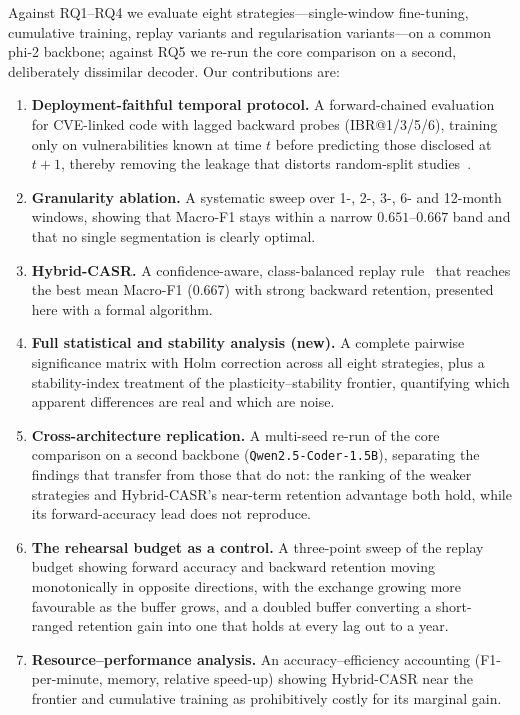 \documentclass[a4paper,twoside]{article}
\begin{document}
Against RQ1--RQ4 we evaluate eight strategies---single-window fine-tuning, cumulative training, replay variants and regularisation variants---on a common phi-2 backbone; against RQ5 we re-run the core comparison on a second, deliberately dissimilar decoder. Our contributions are:
\begin{enumerate}
    \item \textbf{Deployment-faithful temporal protocol.} A forward-chained evaluation for CVE-linked code with lagged backward probes (IBR@1/3/5/6), training only on vulnerabilities known at time $t$ before predicting those disclosed at $t{+}1$, thereby removing the leakage that distorts random-split studies~\citep{Lyu2022Splitting}.
    \item \textbf{Granularity ablation.} A systematic sweep over 1-, 2-, 3-, 6- and 12-month windows, showing that Macro-F1 stays within a narrow $0.651$--$0.667$ band and that no single segmentation is clearly optimal.
    \item \textbf{Hybrid-CASR.} A confidence-aware, class-balanced replay rule~\citep{Aljundi2019MIR} that reaches the best mean Macro-F1 ($0.667$) with strong backward retention, presented here with a formal algorithm.
    \item \textbf{Full statistical and stability analysis (new).} A complete pairwise significance matrix with Holm correction across all eight strategies, plus a stability-index treatment of the plasticity--stability frontier, quantifying which apparent differences are real and which are noise.
    \item \textbf{Cross-architecture replication.} A multi-seed re-run of the core comparison on a second backbone (\texttt{Qwen2.5-Coder-1.5B}), separating the findings that transfer from those that do not: the ranking of the weaker strategies and Hybrid-CASR's near-term retention advantage both hold, while its forward-accuracy lead does not reproduce.
    \item \textbf{The rehearsal budget as a control.} A three-point sweep of the replay budget showing forward accuracy and backward retention moving monotonically in opposite directions, with the exchange growing more favourable as the buffer grows, and a doubled buffer converting a short-ranged retention gain into one that holds at every lag out to a year.
    \item \textbf{Resource--performance analysis.} An accuracy--efficiency accounting (F1-per-minute, memory, relative speed-up) showing Hybrid-CASR near the frontier and cumulative training as prohibitively costly for its marginal gain.
\end{enumerate}
\end{document}
